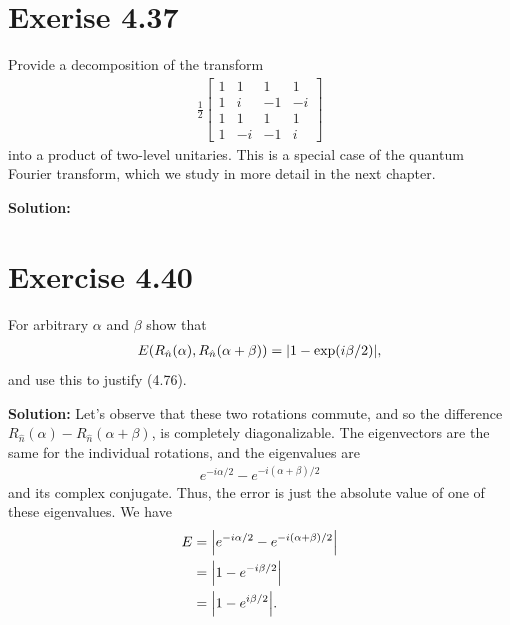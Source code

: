 \documentclass{book}
\begin{document}
\section*{Exerise 4.37}
    Provide a decomposition of the transform
    \begin{align}
        \frac{1}{2}\begin{bmatrix}
            1 & 1  & 1  & 1 \\
            1 & i  & -1 & -i \\
            1 & 1  & 1  & 1 \\
            1 & -i & -1 & i 
        \end{bmatrix}
    \end{align}
    into a product of two-level unitaries. This is a special case of the quantum Fourier transform, which we study in more detail in the next chapter. 

    \textbf{Solution:} 
    
\section*{Exercise 4.40}
    For arbitrary $\alpha$ and $\beta$ show that 
    \begin{align}
        E(R_{\hat{n}}(\alpha), R_{\hat{n}}(\alpha + \beta)) = \abs{1 - \exp(i\beta/2)},
    \end{align}
    and use this to justify (4.76).

    \textbf{Solution:} Let's observe that these two rotations commute, and so the difference $R_{\hat{n}}(\alpha)- R_{\hat{n}}(\alpha + \beta)$, is completely diagonalizable. The eigenvectors are the same for the individual rotations, and the eigenvalues are 
    \begin{align}
        e^{-i\alpha/2} - e^{-i(\alpha + \beta)/2}
    \end{align}
    and its complex conjugate. Thus, the error is just the absolute value of one of these eigenvalues. We have
    \begin{align}
    \begin{aligned}
        E &= \abs{e^{-i\alpha/2} - e^{-i(\alpha + \beta)/2}} \\
        &= \abs{1 - e^{-i\beta/2}} \\
        &= \abs{1 - e^{i\beta/2}}.
    \end{aligned}
    \end{align}
\end{document}
